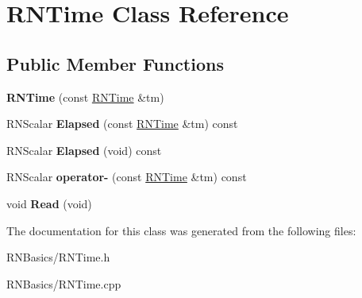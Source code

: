 \hypertarget{class_r_n_time}{}\section{R\+N\+Time Class Reference}
\label{class_r_n_time}
\subsection*{Public Member Functions}
\begin{DoxyCompactItemize}
\item 
{\bfseries R\+N\+Time} (const \hyperlink{class_r_n_time}{R\+N\+Time} \&tm)\hypertarget{class_r_n_time_a3efd59e4ff8b0471369f22a2b4217614}{}\label{class_r_n_time_a3efd59e4ff8b0471369f22a2b4217614}

\item 
R\+N\+Scalar {\bfseries Elapsed} (const \hyperlink{class_r_n_time}{R\+N\+Time} \&tm) const \hypertarget{class_r_n_time_acf50bf21caa28355975899f1291a668d}{}\label{class_r_n_time_acf50bf21caa28355975899f1291a668d}

\item 
R\+N\+Scalar {\bfseries Elapsed} (void) const \hypertarget{class_r_n_time_a547dab3772b7cfa2d6756583fa9cf58f}{}\label{class_r_n_time_a547dab3772b7cfa2d6756583fa9cf58f}

\item 
R\+N\+Scalar {\bfseries operator-\/} (const \hyperlink{class_r_n_time}{R\+N\+Time} \&tm) const \hypertarget{class_r_n_time_a51c4502e411c14b454bb85daa3a887b2}{}\label{class_r_n_time_a51c4502e411c14b454bb85daa3a887b2}

\item 
void {\bfseries Read} (void)\hypertarget{class_r_n_time_a18940f0325abdbeeaa1d454d7be32a2b}{}\label{class_r_n_time_a18940f0325abdbeeaa1d454d7be32a2b}

\end{DoxyCompactItemize}


The documentation for this class was generated from the following files\+:\begin{DoxyCompactItemize}
\item 
R\+N\+Basics/R\+N\+Time.\+h\item 
R\+N\+Basics/R\+N\+Time.\+cpp\end{DoxyCompactItemize}
